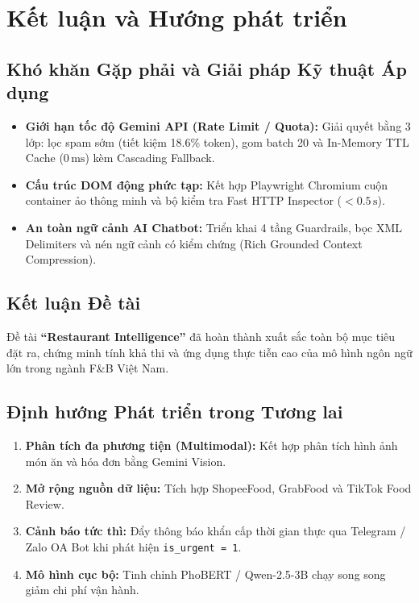 \documentclass[12pt, a4paper, oneside]{book}
\begin{document}
\chapter{Kết luận và Hướng phát triển}

\section{Khó khăn Gặp phải và Giải pháp Kỹ thuật Áp dụng}
\begin{itemize}
    \item \textbf{Giới hạn tốc độ Gemini API (Rate Limit / Quota):} Giải quyết bằng 3 lớp: lọc spam sớm (tiết kiệm 18.6\% token), gom batch 20 và In-Memory TTL Cache ($0\,\mathrm{ms}$) kèm Cascading Fallback.
    \item \textbf{Cấu trúc DOM động phức tạp:} Kết hợp Playwright Chromium cuộn container ảo thông minh và bộ kiểm tra Fast HTTP Inspector ($<0.5\,\mathrm{s}$).
    \item \textbf{An toàn ngữ cảnh AI Chatbot:} Triển khai 4 tầng Guardrails, bọc XML Delimiters và nén ngữ cảnh có kiểm chứng (Rich Grounded Context Compression).
\end{itemize}

\section{Kết luận Đề tài}
Đề tài \textbf{``Restaurant Intelligence''} đã hoàn thành xuất sắc toàn bộ mục tiêu đặt ra, chứng minh tính khả thi và ứng dụng thực tiễn cao của mô hình ngôn ngữ lớn trong ngành F\&B Việt Nam.

\section{Định hướng Phát triển trong Tương lai}
\begin{enumerate}
    \item \textbf{Phân tích đa phương tiện (Multimodal):} Kết hợp phân tích hình ảnh món ăn và hóa đơn bằng Gemini Vision.
    \item \textbf{Mở rộng nguồn dữ liệu:} Tích hợp ShopeeFood, GrabFood và TikTok Food Review.
    \item \textbf{Cảnh báo tức thì:} Đẩy thông báo khẩn cấp thời gian thực qua Telegram / Zalo OA Bot khi phát hiện \texttt{is\_urgent = 1}.
    \item \textbf{Mô hình cục bộ:} Tinh chỉnh PhoBERT / Qwen-2.5-3B chạy song song giảm chi phí vận hành.
\end{enumerate}
\end{document}
